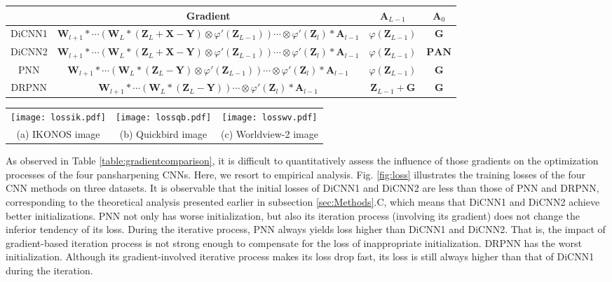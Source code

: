 \documentclass[journal]{IEEEtran}
\begin{document}
\begin{table*}[htb]
\caption{Gradients involved in four pansharpening CNNs}
\centering
\begin{tabular}{c|ccc}
\hline
{}&Gradient&$\mathbf{A}_{L-1}$&$\mathbf{A}_0$\\
\hline
DiCNN1&  $\mathbf{W}_{l+1}* \cdots (\mathbf{W}_{L} * (\mathbf{Z}_{L} + \mathbf{X} - \mathbf{Y}) \otimes \varphi'(\mathbf{Z}_{L-1}) ) \cdots \otimes \varphi'(\mathbf{Z}_l) * \mathbf{A}_{l-1}$  &$\varphi(\mathbf{Z}_{L-1})$&$\mathbf{G}$\\
\hline
DiCNN2& $\mathbf{W}_{l+1}* \cdots (\mathbf{W}_{L} * (\mathbf{Z}_{L} + \mathbf{X} - \mathbf{Y}) \otimes \varphi'(\mathbf{Z}_{L-1}) ) \cdots \otimes \varphi'(\mathbf{Z}_l) * \mathbf{A}_{l-1}$ &$\varphi(\mathbf{Z}_{L-1})$&$\mathbf{PAN}$\\
\hline
PNN & $\mathbf{W}_{l+1}* \cdots (\mathbf{W}_{L} * (\mathbf{Z}_{L}  - \mathbf{Y}) \otimes \varphi'(\mathbf{Z}_{L-1}) ) \cdots \otimes \varphi'(\mathbf{Z}_l) * \mathbf{A}_{l-1}$ &$\varphi(\mathbf{Z}_{L-1})$&$\mathbf{G}$\\
\hline
DRPNN & $\mathbf{W}_{l+1}* \cdots (\mathbf{W}_{L} * (\mathbf{Z}_{L}  - \mathbf{Y})  ) \cdots \otimes \varphi'(\mathbf{Z}_l) * \mathbf{A}_{l-1}$ &$\mathbf{Z}_{L-1}+\mathbf{G}$&$\mathbf{G}$\\
\hline
\end{tabular}
\label{table:gradientcomparison}
\end{table*}

\begin{figure*}[htb]\scriptsize
\centering
\begin{tabular}{ccc}
\texttt{[image: lossik.pdf]}&
\texttt{[image: lossqb.pdf]}&
\texttt{[image: losswv.pdf]}\\
(a) IKONOS image & (b) Quickbird image & (c) Worldview-2 image\\
\end{tabular}
\caption{Training losses of DiCNN1, DiCNN2, PNN and DRPNN}
\label{fig:loss}
\end{figure*}

As observed in Table \ref{table:gradientcomparison}, it is difficult to quantitatively assess the influence of those gradients on the optimization processes of the four pansharpening CNNs. Here, we resort to empirical analysis. Fig. \ref{fig:loss} illustrates the training losses of the four CNN methods on three datasets. It is observable that the initial losses of DiCNN1 and DiCNN2 are less than those of PNN and DRPNN, corresponding to the theoretical analysis presented earlier in subsection \ref{sec:Methods}.C, which means that DiCNN1 and DiCNN2 achieve better initializations. PNN not only has worse initialization, but also its iteration process (involving its gradient) does not change the inferior tendency of its loss. During the iterative process, PNN always yields loss higher than DiCNN1 and DiCNN2. That is, the impact of gradient-based iteration process is not strong enough to compensate for the loss of inappropriate initialization. DRPNN has the worst initialization. Although its gradient-involved iterative process makes its loss drop fast, its loss is still always higher than that of DiCNN1 during the iteration.
\end{document}
